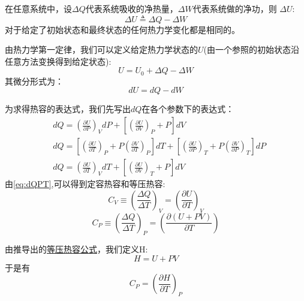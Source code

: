 \documentclass[12pt, a4paper, oneside]{ctexbook}
\newcommand{\hl}[1]{\hlbox{#1}}
\newcommand{\optxt}[1]{\textcolor{opcol}{#1}}
\newcommand{\tit}[1]{\begin{center}
          \large\hl{#1}
        \end{center}}
\newcounter{#2}
\newcounter{#2}[#1]
\numberwithin{#2}{#1}
\begin{document}
          \begin{law}
            \tit{热力学第一定律}
            在任意系统中，设$\Delta Q$代表系统吸收的净热量，\(\Delta W\)代表系统做的净功，则 \(\Delta U\):
            \begin{equation}
              \Delta U\triangleq \Delta Q-\Delta W
            \end{equation}
            对于给定了初始状态和最终状态的任何热力学变化都是相同的。
          \end{law}
          \begin{define}
            由热力学第一定律，我们可以定义给定热力学状态的\hl{内能}\(U\)(\optxt{由一个参照的初始状态沿任意方法变换得到给定状态}):
            \begin{equation*}
              U=U_0+\Delta Q-\Delta W
            \end{equation*}
            其\optxt{微分形式}为：
            \begin{equation}
              dU=dQ-dW
            \end{equation}
          \end{define}
          \begin{deduce}
            \label{ded:dQ}
            为求得热容的表达式，我们先写出\(dQ\)在各个参数下的表达式：
            \begin{align}
              \label{eq:dQPV}&d Q=\left(\frac{\partial U}{\partial P}\right)_V d P+\left[\left(\frac{\partial U}{\partial V}\right)_P+P\right] d V \\
              \label{eq:dQPT}&d Q=\left[\left(\frac{\partial U}{\partial T}\right)_P+P\left(\frac{\partial V}{\partial T}\right)_P\right] d T+\left[\left(\frac{\partial U}{\partial P}\right)_T+P\left(\frac{\partial V}{\partial P}\right)_T\right] d P \\
              \label{eq:dQVT}&d Q=\left(\frac{\partial U}{\partial T}\right)_V d T+\left[\left(\frac{\partial U}{\partial V}\right)_T+P\right] d V
              \end{align}
              由\autoref{eq:dQPT},可以得到定容热容和等压热容:
              \begin{equation}
                C_V\equiv \left(\frac{\Delta Q}{\Delta T}\right)_V=\left(\frac{\partial U}{\partial T}\right)_V
              \end{equation}
              \begin{equation}
                C_P\equiv \left(\frac{\Delta Q}{\Delta T}\right)_P=\left(\frac{\partial (U+PV)}{\partial T}\right)
              \end{equation}
          \end{deduce}
          \begin{define}
            由推导出的\hyperref[ded:dQ]{等压热容公式}，我们定义\hl{焓}H:
            \begin{equation}
              H=U+PV
            \end{equation}
            于是有
            \begin{equation}
              C_P=\left(\frac{\partial H}{\partial T}\right)_P
            \end{equation}
          \end{define}
        
\end{document}
